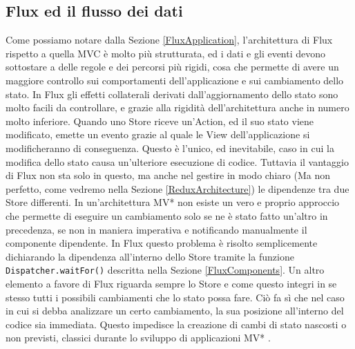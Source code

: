 \subsection{Flux ed il flusso dei dati}
Come possiamo notare dalla Sezione \ref{FluxApplication}, l'architettura di Flux rispetto a quella MVC è molto più strutturata, ed i dati e gli eventi devono sottostare a delle regole e dei percorsi più rigidi, cosa che permette di avere un maggiore controllo sui comportamenti dell'applicazione e sui cambiamento dello stato. In Flux gli effetti collaterali derivati dall'aggiornamento dello stato sono molto facili da controllare, e grazie alla rigidità dell'architettura anche in numero molto inferiore. Quando uno Store riceve un'Action, ed il suo stato viene modificato, emette un evento grazie al quale le View dell'applicazione si modificheranno di conseguenza. Questo è l'unico, ed inevitabile, caso in cui la modifica dello stato causa un'ulteriore esecuzione di codice. 
Tuttavia il vantaggio di Flux non sta solo in questo, ma anche nel gestire in modo chiaro (Ma non perfetto, come vedremo nella Sezione \ref{ReduxArchitecture}) le dipendenze tra due Store differenti. In un'architettura MV* non esiste un vero e proprio approccio che permette di eseguire un cambiamento solo se ne è stato fatto un'altro in precedenza, se non in maniera imperativa e notificando manualmente il componente dipendente. In Flux questo problema è risolto semplicemente dichiarando la dipendenza all'interno dello Store tramite la funzione \texttt{Dispatcher.waitFor()} descritta nella Sezione \ref{FluxComponents}.
Un altro elemento a favore di Flux riguarda sempre lo Store e come questo integri in se stesso tutti i possibili cambiamenti che lo stato possa fare. Ciò fa sì che nel caso in cui si debba analizzare un certo cambiamento, la sua posizione all'interno del codice sia immediata. Questo impedisce la creazione di cambi di stato nascosti o non previsti, classici durante lo sviluppo di applicazioni MV* \cite{boduch2016flux}.

